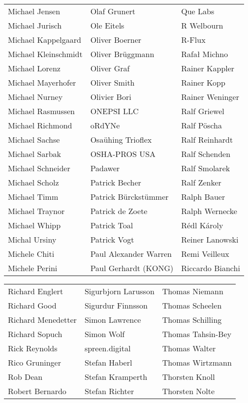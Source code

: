 \begin{small}
\begin{tabular}{p{4cm}p{4cm}p{4cm}}
Michael Jensen & Olaf Grunert & Que Labs \\
Michael Jurisch & Ole Eitels & R Welbourn \\
Michael Kappelgaard & Oliver Boerner & R-Flux \\
Michael Kleinschmidt & Oliver Brüggmann & Rafał Michno \\
Michael Lorenz & Oliver Graf & Rainer Kappler \\
Michael Mayerhofer & Oliver Smith & Rainer Kopp \\
Michael Nurney & Olivier Bori & Rainer Weninger \\
Michael Rasmussen & ONEPSI LLC & Ralf Griewel \\
Michael Richmond & oRdYNe & Ralf Pöscha \\
Michael Sachse & Osaühing Trioflex & Ralf Reinhardt \\
Michael Sarbak & OSHA-PROS USA & Ralf Schenden \\
Michael Schneider & Padawer & Ralf Smolarek \\
Michael Scholz & Patrick Becher & Ralf Zenker \\
Michael Timm & Patrick Bürckstümmer & Ralph Bauer \\
Michael Traynor & Patrick de Zoete & Ralph Wernecke \\
Michael Whipp & Patrick Toal & Rédl Károly \\
Michal Ursiny & Patrick Vogt & Reiner Lanowski \\
Michele Chiti & Paul Alexander Warren & Remi Veilleux \\
Michele Perini & Paul Gerhardt (KONG) & Riccardo Bianchi \\
\end{tabular}
\newpage
\setlength{\tabcolsep}{1mm}
\begin{tabular}{p{4cm}p{4cm}p{4cm}}
Richard Englert & Sigurbjorn Larusson & Thomas Niemann \\
Richard Good & Sigurdur Finnsson & Thomas Scheelen \\
Richard Menedetter & Simon Lawrence & Thomas Schilling \\
Richard Sopuch & Simon Wolf & Thomas Tahsin-Bey \\
Rick Reynolds & spreen.digital & Thomas Walter \\
Rico Gruninger & Stefan Haberl & Thomas Wirtzmann \\
Rob Dean & Stefan Kramperth & Thorsten Knoll \\
Robert Bernardo & Stefan Richter & Thorsten Nolte \\

\end{tabular}
\end{small}
